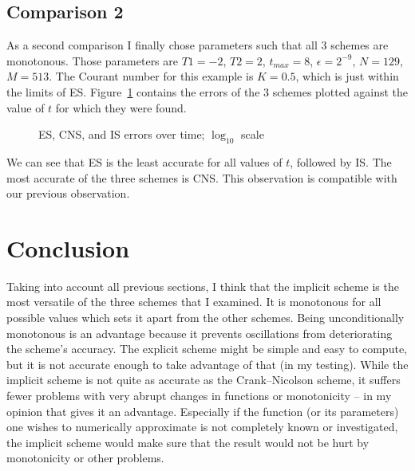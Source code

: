 \documentclass[a4paper, 12pt, reqno]{article}
\newcommand{\figref}[1]{Figure~\ref{#1}}
\begin{document}
\subsection{Comparison 2}

As a second comparison I finally chose parameters such that all 3 schemes are
monotonous. Those parameters are $T1=-2$, $T2=2$, $t_{max}=8$, $\epsilon
= 2^{-9}$, $N=129$, $M=513$. The Courant number for this example is $K=0.5$,
which is just within the limits of ES. \figref{cs07} contains the errors of the
3 schemes plotted against the value of $t$ for which they were found.
\begin{figure}[H]
    \center
    \vspace{-20pt}
    \caption{ES, CNS, and IS errors over time; $\log_{10}$ scale}
    \label{cs07}
\end{figure}
We can see that ES is the least accurate for all values of $t$, followed by IS.
The most accurate of the three schemes is CNS. This observation is compatible
with our previous observation.

\section{Conclusion}

Taking into account all previous sections, I think that the implicit scheme is
the most versatile of the three schemes that I examined. It is monotonous for
all possible values which sets it apart from the other schemes. Being
unconditionally monotonous is an advantage because it prevents oscillations
from deteriorating the scheme's accuracy. The explicit scheme might be simple
and easy to compute, but it is not accurate enough to take advantage of that
(in my testing). While the implicit scheme is not
quite as accurate as the Crank--Nicolson scheme, it suffers fewer problems with
very abrupt changes in functions or monotonicity -- in my opinion that gives it
an advantage. Especially if the function (or its parameters) one wishes to 
numerically approximate is not completely known or investigated, the implicit
scheme would make sure that the result would not be hurt by monotonicity or
other problems.
\end{document}
